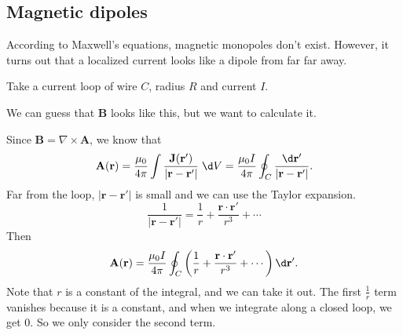 \documentclass[a4paper]{article}
\begin{document}
\subsection{Magnetic dipoles}
According to Maxwell's equations, magnetic monopoles don't exist. However, it turns out that a localized current looks like a dipole from far far away.

\begin{eg}
  Take a current loop of wire $C$, radius $R$ and current $I$.
  \begin{center}
  \end{center}
  We can guess that $\mathbf{B}$ looks like this, but we want to calculate it.

  Since $\mathbf{B} = \nabla \times \mathbf{A}$, we know that
  \[
    \mathbf{A}(\mathbf{r}) = \frac{\mu_0}{4\pi}\int\frac{\mathbf{J}(\mathbf{r}')}{|\mathbf{r}-\mathbf{r}'|}\;\d V = \frac{\mu_0 I}{4\pi}\oint_C \frac{\d \mathbf{r}'}{|\mathbf{r} - \mathbf{r}'|}.
  \]
  Far from the loop, $|\mathbf{r} - \mathbf{r}'|$ is small and we can use the Taylor expansion.
  \[
    \frac{1}{|\mathbf{r} - \mathbf{r}'|} = \frac{1}{r} + \frac{\mathbf{r}\cdot \mathbf{r}'}{r^3} + \cdots
  \]
  Then
  \[
    \mathbf{A}(\mathbf{r}) = \frac{\mu_0 I}{4\pi}\oint_C \left(\frac{1}{r} + \frac{\mathbf{r}\cdot \mathbf{r}'}{r^3} + \cdots\right) \d \mathbf{r}'.
  \]
  Note that $r$ is a constant of the integral, and we can take it out. The first $\frac{1}{r}$ term vanishes because it is a constant, and when we integrate along a closed loop, we get 0. So we only consider the second term.


\end{eg}
\end{document}
